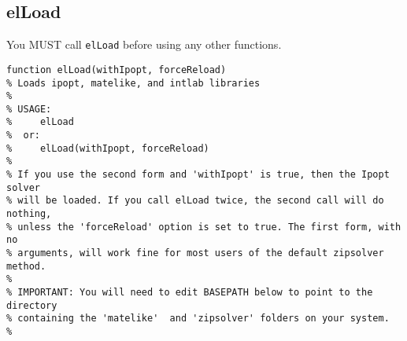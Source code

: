 
\subsection*{elLoad}

You MUST call \texttt{elLoad} before using any other \melike
functions.

\begin{lstlisting}[commentstyle=\ttfamily]
function elLoad(withIpopt, forceReload)
% Loads ipopt, matelike, and intlab libraries
%
% USAGE:
%     elLoad
%  or:
%     elLoad(withIpopt, forceReload)
%
% If you use the second form and 'withIpopt' is true, then the Ipopt solver
% will be loaded. If you call elLoad twice, the second call will do nothing,
% unless the 'forceReload' option is set to true. The first form, with no
% arguments, will work fine for most users of the default zipsolver method.
% 
% IMPORTANT: You will need to edit BASEPATH below to point to the directory
% containing the 'matelike'  and 'zipsolver' folders on your system.
%
\end{lstlisting}

